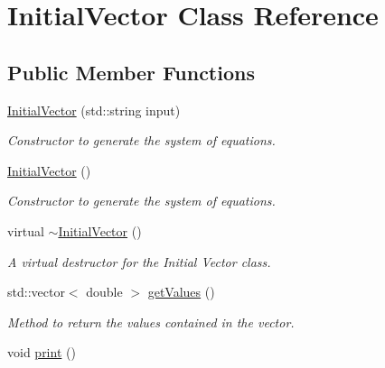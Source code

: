 \hypertarget{class_initial_vector}{}\section{Initial\+Vector Class Reference}
\label{class_initial_vector}
\subsection*{Public Member Functions}
\begin{DoxyCompactItemize}
\item 
\hyperlink{class_initial_vector_a4a8ad49cef57e0644dc18b937265b164}{Initial\+Vector} (std\+::string input)
\begin{DoxyCompactList}\small\item\em Constructor to generate the system of equations. \end{DoxyCompactList}\item 
\hyperlink{class_initial_vector_ace60dc8d6312008b9921b69c07ac2ca7}{Initial\+Vector} ()\hypertarget{class_initial_vector_ace60dc8d6312008b9921b69c07ac2ca7}{}\label{class_initial_vector_ace60dc8d6312008b9921b69c07ac2ca7}

\begin{DoxyCompactList}\small\item\em Constructor to generate the system of equations. \end{DoxyCompactList}\item 
virtual \hyperlink{class_initial_vector_aa18ee624f9f9bdd68e3d211cdccde055}{$\sim$\+Initial\+Vector} ()\hypertarget{class_initial_vector_aa18ee624f9f9bdd68e3d211cdccde055}{}\label{class_initial_vector_aa18ee624f9f9bdd68e3d211cdccde055}

\begin{DoxyCompactList}\small\item\em A virtual destructor for the Initial Vector class. \end{DoxyCompactList}\item 
std\+::vector$<$ double $>$ \hyperlink{class_initial_vector_af01341a5a32b28d6066632959566fecd}{get\+Values} ()\hypertarget{class_initial_vector_af01341a5a32b28d6066632959566fecd}{}\label{class_initial_vector_af01341a5a32b28d6066632959566fecd}

\begin{DoxyCompactList}\small\item\em Method to return the values contained in the vector. \end{DoxyCompactList}\item 
void \hyperlink{class_initial_vector_ae71fa73543bd36443fc19e3c87c7d205}{print} ()\hypertarget{class_initial_vector_ae71fa73543bd36443fc19e3c87c7d205}{}\label{class_initial_vector_ae71fa73543bd36443fc19e3c87c7d205}


\end{DoxyCompactItemize}
